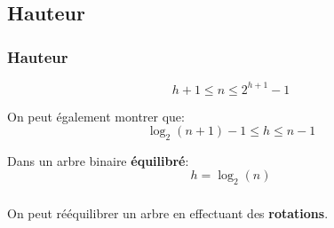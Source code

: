 \documentclass[svgnames,11pt]{beamer}
\begin{document}
\subsection{Hauteur}
\begin{frame}
    \frametitle{Hauteur}

    \begin{center}
        {\Large $$h+1 \leq n \leq 2^{h+1}-1$$    }
    \end{center}
\end{frame}
\begin{frame}
    On peut également montrer que:
    {\Large $$\log_2(n+1)-1 \leq h \leq n-1$$    }
    \begin{aretenir}[]
        Dans un arbre binaire \textbf{équilibré}:
        {\Large $$h = \log_2(n)$$}
    \end{aretenir}
\end{frame}
\begin{frame}
    \frametitle{}

    \begin{aretenir}
        On peut rééquilibrer un arbre en effectuant des \textbf{rotations}.
    \end{aretenir}

\end{frame}
\end{document}
